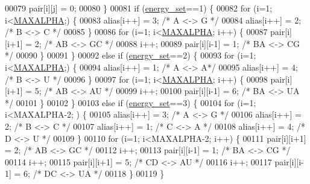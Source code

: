 \begin{DoxyCode}
00079             pair[i][j] = 0;
00080       \}
00081       \textcolor{keywordflow}{if} (\hyperlink{group__model__details_gafb1ef1166da85092ae8a325e02dcae71}{energy\_set}==1) \{
00082          \textcolor{keywordflow}{for} (i=1; i<\hyperlink{group__model__details_ga05a5ffe718aa431d97419a12fb082379}{MAXALPHA};) \{
00083             alias[i++] = 3;  \textcolor{comment}{/* A <-> G */}
00084             alias[i++] = 2;  \textcolor{comment}{/* B <-> C */}
00085          \}
00086          \textcolor{keywordflow}{for} (i=1; i<\hyperlink{group__model__details_ga05a5ffe718aa431d97419a12fb082379}{MAXALPHA}; i++) \{
00087             pair[i][i+1] = 2;    \textcolor{comment}{/* AB <-> GC */}
00088             i++;
00089             pair[i][i-1] = 1;    \textcolor{comment}{/* BA <-> CG */}
00090          \}
00091       \}
00092       \textcolor{keywordflow}{else} \textcolor{keywordflow}{if} (\hyperlink{group__model__details_gafb1ef1166da85092ae8a325e02dcae71}{energy\_set}==2) \{
00093         \textcolor{keywordflow}{for} (i=1; i<\hyperlink{group__model__details_ga05a5ffe718aa431d97419a12fb082379}{MAXALPHA};) \{
00094             alias[i++] = 1;  \textcolor{comment}{/* A <-> A*/}
00095             alias[i++] = 4;  \textcolor{comment}{/* B <-> U */}
00096          \}
00097          \textcolor{keywordflow}{for} (i=1; i<\hyperlink{group__model__details_ga05a5ffe718aa431d97419a12fb082379}{MAXALPHA}; i++) \{
00098             pair[i][i+1] = 5;    \textcolor{comment}{/* AB <-> AU */}
00099             i++;
00100             pair[i][i-1] = 6;    \textcolor{comment}{/* BA <-> UA */}
00101          \}
00102       \}
00103       \textcolor{keywordflow}{else} \textcolor{keywordflow}{if} (\hyperlink{group__model__details_gafb1ef1166da85092ae8a325e02dcae71}{energy\_set}==3) \{
00104         \textcolor{keywordflow}{for} (i=1; i<MAXALPHA-2; ) \{
00105           alias[i++] = 3;  \textcolor{comment}{/* A <-> G */}
00106           alias[i++] = 2;  \textcolor{comment}{/* B <-> C */}
00107           alias[i++] = 1;  \textcolor{comment}{/* C <-> A */}
00108           alias[i++] = 4;  \textcolor{comment}{/* D <-> U */}
00109         \}
00110         \textcolor{keywordflow}{for} (i=1; i<MAXALPHA-2; i++) \{
00111           pair[i][i+1] = 2;    \textcolor{comment}{/* AB <-> GC */}
00112           i++;
00113           pair[i][i-1] = 1;    \textcolor{comment}{/* BA <-> CG */}
00114           i++;
00115           pair[i][i+1] = 5;    \textcolor{comment}{/* CD <-> AU */}
00116           i++;
00117           pair[i][i-1] = 6;    \textcolor{comment}{/* DC <-> UA */}
00118         \}
00119       \}

\end{DoxyCode}
